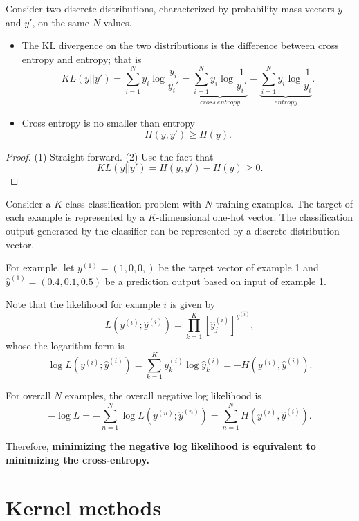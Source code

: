 \begin{refsection}
\begin{lemma}
	Consider two discrete distributions, characterized by probability mass vectors $y$ and $y'$, on the same $N$ values. 
	\begin{itemize}
		\item The KL divergence on the two distributions is the difference between cross entropy and entropy; that is
		$$KL(y||y') = \sum_{i=1}^{N} y_i \log \frac{y_i}{y_i'} = \underbrace{\sum_{i=1}^N y_i\log \frac{1}{y_i'}}_{cross~entropy} - \underbrace{\sum_{i=1}^N y_i\log \frac{1}{y_i}}_{entropy}.$$
		\item Cross entropy is no smaller than entropy 
		$$H(y,y') \geq H(y).$$
	\end{itemize} 	
\end{lemma}
\begin{proof}
	(1) Straight forward. (2) Use the fact that
	$$KL(y||y') = H(y,y') - H(y) \geq 0.$$
\end{proof}


\begin{remark}
	Consider a $K$-class classification problem with $N$ training examples. The target of each example is represented by a $K$-dimensional one-hot vector. The classification output generated by the classifier can be represented by a discrete distribution vector. 
	
	For example, let $y^{(1)} = (1,0,0,)$ be the target vector of example 1 and $\hat{y}^{(1)} = (0.4,0.1,0.5)$ be a prediction output based on input of example 1. 
	
	Note that the likelihood for example $i$ is given by
	$$L(y^{(i)};\hat{y}^{(i)}) = \prod_{k=1}^K [\hat{y}^{(i)}_j]^{y^{(i)}},$$
	whose the logarithm form is
	$$\log L(y^{(i)};\hat{y}^{(i)}) = \sum_{k=1}^K y^{(i)}_k \log \hat{y}^{(i)}_k = -H(y^{(i)},\hat{y}^{(i)}).$$
	
	For overall $N$ examples, the overall negative log likelihood is
	$$-\log L = - \sum_{n=1}^N \log L(y^{(n)};\hat{y}^{(n)}) =\sum_{n=1}^N H(y^{(i)},\hat{y}^{(i)}).$$
	
	Therefore, \textbf{minimizing the negative log likelihood is equivalent to minimizing the cross-entropy.}
	
	
\end{remark}


\section{Kernel methods}

\end{refsection}
